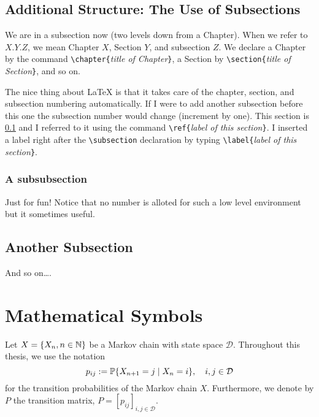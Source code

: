 \subsection{Additional Structure: The Use of Subsections}
\label{sec:structure} We are in a subsection now (two levels down
from a Chapter). When we refer to $X.Y.Z$, we mean Chapter $X$,
Section $Y$, and subsection $Z$. We declare a Chapter by the command
\verb|\chapter{|\emph{title of Chapter}\verb|}|, a Section by
\verb|\section{|\emph{title of Section}\verb|}|, and so on.

The nice thing about \LaTeX{} is that it takes care of the chapter,
section, and subsection numbering automatically. If I were to add
another subsection before this one the subsection number would
change (increment by one). This section is \ref{sec:structure} and I
referred to it using the command \verb|\ref{|\emph{label of this
section}\verb|}|. I inserted a label right after the
\verb|\subsection| declaration by typing \verb|\label{|\emph{label
of this section}\verb|}|.

\subsubsection{A subsubsection}\label{subsub} Just for fun! Notice
that no number is alloted for such a low level environment but it
sometimes useful.

\subsection{Another Subsection}
And so on\ldots.

\section{Mathematical Symbols}
Let $X=\{X_n, n\in \mathbb{N}\}$ be a Markov chain with state space
$\mathcal{D}$. Throughout this thesis, we use the notation
\begin{equation}
p_{ij} := \P\{X_{n+1} = j \mid X_n = i\}, \quad i,j \in \mathcal{D}
\label{pij}
\end{equation}
for the transition probabilities of the Markov chain $X$.
Furthermore, we denote by $P$ the transition matrix, $P =
[p_{ij}]_{i,j\in\mathcal{D}}$.

